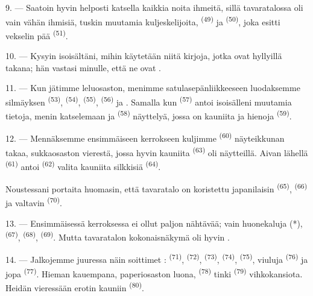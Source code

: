 9. --- Saatoin hyvin helposti katsella kaikkia noita ihmeitä, sillä tavaratalossa
oli vain vähän ihmisiä, tuskin muutamia kuljeskelijoita, 
\textsuperscript{(49)} ja  \textsuperscript{(50)}, joka
esitti vekselin pää \textsuperscript{(51)}.

10. --- Kysyin isoisältäni, mihin käytetään niitä kirjoja, jotka ovat hyllyillä
 takana; hän vastasi minulle, että ne ovat
.

\VUsaut{3.6mm}
\VUsaut{2.8mm}

11. --- Kun jätimme leluosaston, menimme satulasepänliikkeeseen luodaksemme
silmäyksen  \textsuperscript{(53)}, 
\textsuperscript{(54)},  \textsuperscript{(55)},
 \textsuperscript{(56)} ja .
Samalla kun  \textsuperscript{(57)} antoi isoisälleni
muutamia tietoja, menin katselemaan  ja 
\textsuperscript{(58)} näyttelyä, jossa on kauniita  ja
hienoja  \textsuperscript{(59)}.

12. --- Mennäksemme ensimmäiseen kerrokseen kuljimme 
\textsuperscript{(60)} näyteikkunan takaa, sukkaosaston vierestä, jossa hyvin
kauniita  \textsuperscript{(63)} oli näytteillä. Aivan
lähellä  \textsuperscript{(61)} antoi 
\textsuperscript{(62)} valita kauniita silkkisiä 
\textsuperscript{(64)}.

Noustessani portaita huomasin, että tavaratalo on koristettu japanilaisin
 \textsuperscript{(65)}, 
\textsuperscript{(66)} ja valtavin  \textsuperscript{(70)}.

13. --- Ensimmäisessä kerroksessa ei ollut paljon nähtävää; vain huonekaluja (*),
 \textsuperscript{(67)}, 
\textsuperscript{(68)},  \textsuperscript{(69)}. Mutta
tavaratalon kokonaisnäkymä oli hyvin .

14. --- Jalkojemme juuressa näin soittimet : 
\textsuperscript{(71)},  \textsuperscript{(72)},
 \textsuperscript{(73)}, 
\textsuperscript{(74)},  \textsuperscript{(75)}, viuluja
 \textsuperscript{(76)} ja jopa 
\textsuperscript{(77)}. Hieman kauempana, paperiosaston luona,
 \textsuperscript{(78)} tinki 
\textsuperscript{(79)} vihkokansiota. Heidän vieressään erotin kauniin
 \textsuperscript{(80)}.

